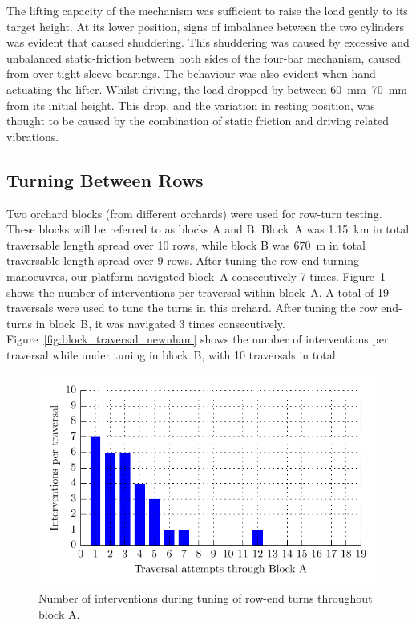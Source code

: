 \documentclass[preprint,authoryear,12pt]{elsarticle}
\begin{document}
    The lifting capacity of the mechanism was sufficient to raise the load gently to its target height.
    At its lower position, signs of imbalance between the two cylinders was evident that caused shuddering.
    This shuddering was caused by excessive and unbalanced static-friction between both sides of the four-bar mechanism, caused from over-tight sleeve bearings.
    The behaviour was also evident when hand actuating the lifter.
    Whilst driving, the load dropped by between \SIrange{60}{70}{\milli\meter} from its initial height.
    This drop, and the variation in resting position, was thought to be caused by the combination of static friction and driving related vibrations.

  \subsection{Turning Between Rows}

    Two orchard blocks (from different orchards) were used for row-turn testing.
    These blocks will be referred to as blocks A and B.
    Block~A was \SI{1.15}{\kilo\meter} in total traversable length spread over 10 rows, while block B was \SI{670}{\meter} in total traversable length spread over 9 rows.
    After tuning the row-end turning manoeuvres, our platform navigated block~A consecutively 7 times.
    Figure~\ref{fig:block_traversal_bateman} shows the number of interventions per traversal within block~A.
    A total of 19 traversals were used to tune the turns in this orchard.
    After tuning the row end-turns in block~B, it was navigated 3 times consecutively.
    Figure~\ref{fig:block_traversal_newnham} shows the number of interventions per traversal while under tuning in block~B, with 10 traversals in total.

    \begin{figure}[htb]
        \centering
        \includegraphics{imgs/tuning_graphs/bateman.pdf}
        \caption{
            Number of interventions during tuning of row-end turns throughout block A.
        }
        \label{fig:block_traversal_bateman}
    \end{figure}
\end{document}
